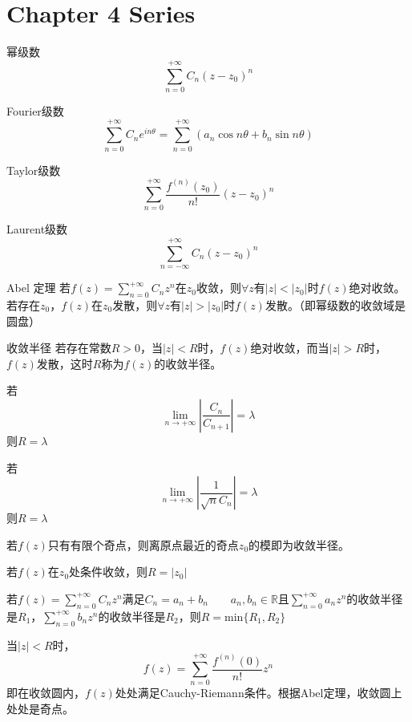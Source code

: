 \section{Chapter 4 Series}
\begin{definition*}{幂级数}
    \[\sum_{n=0}^{+\infty}C_n(z-z_0)^n\]
\end{definition*}
\begin{definition*}{Fourier级数}
    \[\sum_{n=0}^{+\infty}C_ne^{in\theta} = \sum_{n=0}^{+\infty}(a_n\cos n\theta + b_n\sin n\theta)\]
\end{definition*}
\begin{definition*}{Taylor级数}
    \[\sum_{n=0}^{+\infty}\frac{f^{(n)}(z_0)}{n!}(z-z_0)^n\]
\end{definition*}
\begin{definition*}{Laurent级数}
    \[\sum_{n=-\infty}^{+\infty}C_n(z-z_0)^n\]
\end{definition*}
\begin{theorem*}{Abel 定理}
    若$f(z)=\sum_{n=0}^{+\infty}C_nz^n$在$z_0$收敛，则$\forall z$有$|z|<|z_0|$时$f(z)$绝对收敛。
    若存在$z_0$，$f(z)$在$z_0$发散，则$\forall z$有$|z|>|z_0|$时$f(z)$发散。（即幂级数的收敛域是圆盘）
\end{theorem*}
\begin{definition*}{收敛半径}
    若存在常数$R>0$，当$|z|<R$时，$f(z)$绝对收敛，而当$|z|>R$时，$f(z)$发散，这时$R$称为$f(z)$的收敛半径。
\end{definition*}
\begin{theorem*}
    若\[\lim_{n\rightarrow+\infty}|\frac{C_n}{C_{n+1}}|=\lambda\]
    则$R=\lambda$
\end{theorem*}
\begin{theorem*}
    若\[\lim_{n\rightarrow+\infty} |\frac{1}{\sqrt{n}{C_n}}|=\lambda\]
    则$R=\lambda$
\end{theorem*}
\begin{theorem*}
    若$f(z)$只有有限个奇点，则离原点最近的奇点$z_0$的模即为收敛半径。
\end{theorem*}
\begin{theorem*}
    若$f(z)$在$z_0$处条件收敛，则$R=|z_0|$
\end{theorem*}
\begin{theorem*}
    若$f(z)=\sum_{n=0}^{+\infty}C_nz^n$满足$C_n = a_n + b_n\qquad a_n,b_n\in\mathbb{R}$且$\sum_{n=0}^{+\infty}a_nz^n$的收敛半径是$R_1$，$\sum_{n=0}^{+\infty}b_nz^n$的收敛半径是$R_2$，则$R=\mathrm{min}\{R_1,R_2\}$
\end{theorem*}
\begin{theorem*}
当$|z|<R$时，\[f(z)=\sum_{n=0}^{+\infty}\frac{f^{(n)}(0)}{n!}z^n\]
即在收敛圆内，$f(z)$处处满足Cauchy-Riemann条件。根据Abel定理，收敛圆上处处是奇点。
\end{theorem*}
